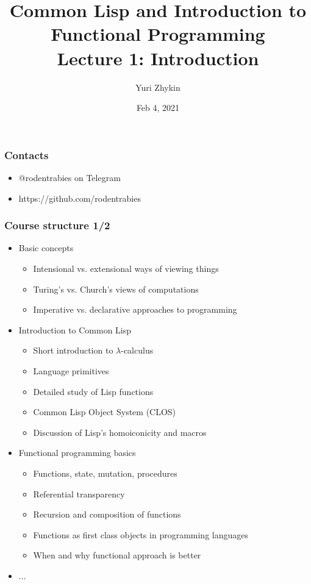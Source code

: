 \documentclass{beamer}
\title{
  Common Lisp and Introduction to Functional Programming \\
  Lecture 1: Introduction
}
\author{Yuri Zhykin}
\date{Feb 4, 2021}
\begin{document}
\frame{\titlepage}

\begin{frame}
  \frametitle{Contacts}
  \begin{itemize}
    \item @rodentrabies on Telegram
    \item https://github.com/rodentrabies
  \end{itemize}
\end{frame}

\begin{frame}
  \frametitle{Course structure 1/2}
  \begin{itemize}
  \item Basic concepts
    \begin{itemize}
    \item Intensional vs. extensional ways of viewing things
    \item Turing's vs. Church's views of computations
    \item Imperative vs. declarative approaches to programming
    \end{itemize}
  \item Introduction to Common Lisp
    \begin{itemize}
    \item Short introduction to $\lambda$-calculus 
    \item Language primitives
    \item Detailed study of Lisp functions
    \item Common Lisp Object System (CLOS)
    \item Discussion of Lisp's homoiconicity and macros
    \end{itemize}
  \item Functional programming basics
    \begin{itemize}
    \item Functions, state, mutation, procedures
    \item Referential transparency
    \item Recursion and composition of functions
    \item Functions as first class objects in programming languages
    \item When and why functional approach is better
    \end{itemize}
  \item[] ...
  \end{itemize}
\end{frame}
\end{document}
